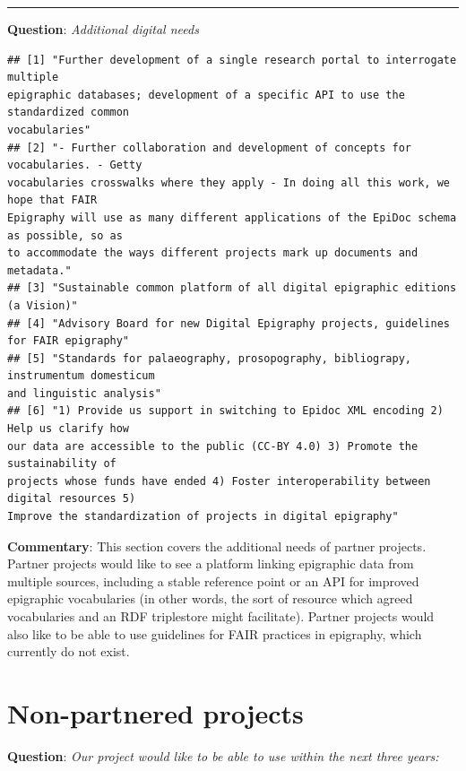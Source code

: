 \documentclass[
  12pt,
]{scrreprt}
\begin{document}
\begin{center}\rule{0.5\linewidth}{0.5pt}\end{center}

\textbf{Question}: \emph{Additional digital needs}

\footnotesize

\begin{verbatim}
## [1] "Further development of a single research portal to interrogate multiple
epigraphic databases; development of a specific API to use the standardized common
vocabularies"
## [2] "- Further collaboration and development of concepts for vocabularies. - Getty
vocabularies crosswalks where they apply - In doing all this work, we hope that FAIR
Epigraphy will use as many different applications of the EpiDoc schema as possible, so as
to accommodate the ways different projects mark up documents and metadata."
## [3] "Sustainable common platform of all digital epigraphic editions (a Vision)"
## [4] "Advisory Board for new Digital Epigraphy projects, guidelines for FAIR epigraphy"
## [5] "Standards for palaeography, prosopography, bibliograpy, instrumentum domesticum
and linguistic analysis"
## [6] "1) Provide us support in switching to Epidoc XML encoding 2) Help us clarify how
our data are accessible to the public (CC-BY 4.0) 3) Promote the sustainability of
projects whose funds have ended 4) Foster interoperability between digital resources 5)
Improve the standardization of projects in digital epigraphy"
\end{verbatim}

\normalsize

\textbf{Commentary}: This section covers the additional needs of partner
projects. Partner projects would like to see a platform linking
epigraphic data from multiple sources, including a stable reference
point or an API for improved epigraphic vocabularies (in other words,
the sort of resource which agreed vocabularies and an RDF triplestore
might facilitate). Partner projects would also like to be able to use
guidelines for FAIR practices in epigraphy, which currently do not
exist.

\hypertarget{non-partnered-projects}{%
\section{Non-partnered projects}\label{non-partnered-projects}}

\textbf{Question}: \emph{Our project would like to be able to use within
the next three years:}
\end{document}
